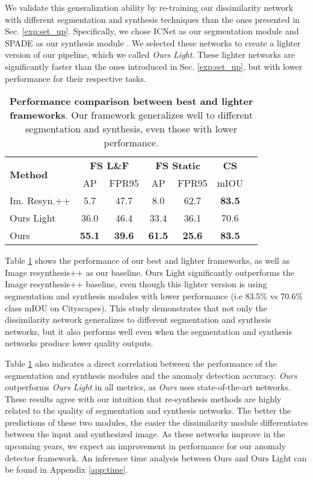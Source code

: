 \documentclass[final]{cvpr}
\begin{document}
We validate this generalization ability by re-training our dissimilarity network with different segmentation and synthesis techniques than the ones presented in Sec. \ref{exp:set_up}. Specifically, we chose ICNet as our segmentation module \cite{icnet} and SPADE as our synthesis module \cite{SPADE}. 
We selected these networks to create a lighter version of our pipeline, which we called \textit{Ours Light}. These lighter networks are significantly faster than the ones introduced in Sec. \ref{exp:set_up}, but with lower performance for their respective tasks. 

\begin{table}[]\centering
\setlength{\tabcolsep}{2.6pt}
\begin{tabular}{lcccccc}\toprule
\multirow{2}{*}{\textbf{Method}} &\multicolumn{2}{c}{\textbf{FS L\&F}} &\multicolumn{2}{c}{\textbf{FS Static}} &\textbf{CS} \\
&AP &FPR95 &AP &FPR95 &mIOU \\\midrule
Im. Resyn.++ &5.7 &47.7 &8.0 &62.7 &\textbf{83.5} \\ 
Ours Light &36.0 &46.4 &33.4 &36.1 &70.6 \\
Ours &\textbf{55.1} &\textbf{39.6} &\textbf{61.5} &\textbf{25.6} &\textbf{83.5} \\
\bottomrule
\end{tabular}
\caption{\textbf{Performance comparison between best and lighter frameworks}. Our framework generalizes well to different segmentation and synthesis, even those with lower performance.}
\label{tab:light}
\vspace{-5mm}
\end{table}

Table \ref{tab:light} shows the performance of our best and lighter frameworks, as well as Image resynthesis++ as our baseline. Ours Light significantly outperforms the Image resynthesis++ baseline, even though this lighter version is using segmentation and synthesis modules with lower performance (i.e 83.5\% vs 70.6\% class mIOU on Cityscapes). 
This study demonstrates that not only the dissimilarity network generalizes to different segmentation and synthesis networks, but it also performs well even when the segmentation and synthesis networks produce lower quality outputs. 

Table \ref{tab:light} also indicates a direct correlation between the performance of the segmentation and synthesis modules and the anomaly detection accuracy. \textit{Ours} outperforms \textit{Ours Light} in all metrics, as \textit{Ours} uses state-of-the-art networks. 
These results agree with our intuition that re-synthesis methods are highly related to the quality of segmentation and synthesis networks. The better the predictions of these two modules, the easier the dissimilarity module differentiates between the input and synthesized image.  
As these networks improve in the upcoming years, we expect an improvement in performance for our anomaly detector framework.
An inference time analysis between Ours and Ours Light can be found in Appendix \ref{app:time}.
\end{document}
